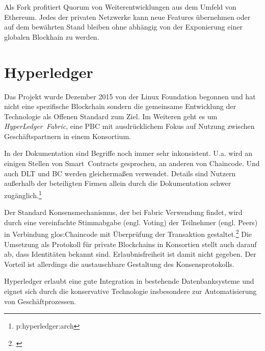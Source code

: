 Als Fork profitiert Quorum von Weiterentwicklungen aus dem Umfeld von Ethereum. Jedes der privaten Netzwerke kann neue Features übernehmen oder auf dem bewährten Stand bleiben ohne abhängig von der Exponierung einer globalen Blockhain zu werden.

\section{Hyperledger}\label{impl:hyperledger}

Das Projekt wurde Dezember 2015 von der Linux Foundation begonnen und hat nicht eine spezifische Blockchain sondern die gemeinsame Entwicklung der Technologie als Offenen Standard zum Ziel. Im Weiteren geht es um \emph{HyperLedger~Fabric}, eine \gls{PBC} mit ausdrücklichem Fokus auf Nutzung zwischen Geschäftspartnern in einem Konsortium.

In der Dokumentation sind Begriffe noch immer sehr inkonsistent. U.a. wird an einigen Stellen von Smart~Contracts gesprochen, an anderen von Chaincode. Und auch \gls{DLT} und \gls{BC} werden gleichermaßen verwendet.
Details sind Nutzern außerhalb der beteiligten Firmen allein durch die Dokumentation schwer zugänglich.\footnote{p:hyperledger:arch}

Der Standard Konsensmechanismus, der bei  Fabric Verwendung findet, wird durch eine vereinfachte Stimmabgabe (engl. Voting) der Teilnehmer (engl. Peers) in Verbindung \gls{glos:Chaincode} mit Überprüfung der Transaktion gestaltet.\footnote{\cite{w:hyperledger:txworkflow}}
Die Umsetzung als Protokoll für private Blockchains in Konsortien stellt auch darauf ab, dass Identitäten bekannt sind. Erlaubnisfreiheit ist damit nicht gegeben.
Der Vorteil ist allerdings die austauschbare Gestaltung des Konsensprotokolls. 

Hyperledger erlaubt eine gute Integration in bestehende Datenbanksysteme und eignet sich durch die konservative Technologie insbesondere zur Automatisierung von Geschäftprozessen.




